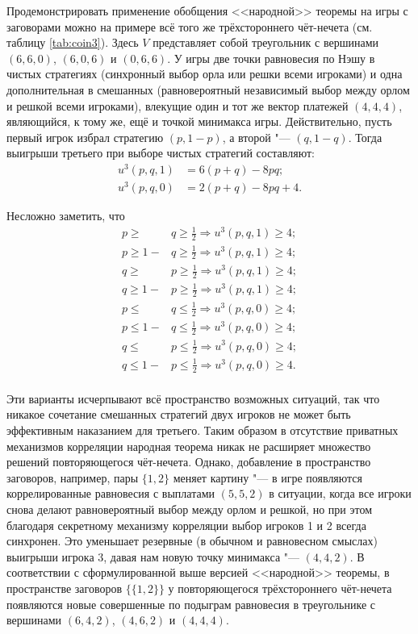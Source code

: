 Продемонстрировать применение обобщения <<народной>> теоремы на игры с заговорами можно на примере всё того же трёхстороннего чёт-нечета (см. таблицу \ref{tab:coin3}). Здесь $V$ представляет собой треугольник с вершинами $(6, 6, 0)$, $(6, 0, 6)$ и $(0, 6, 6)$. У игры две точки равновесия по Нэшу в чистых стратегиях (синхронный выбор орла или решки всеми игроками) и одна дополнительная в смешанных (равновероятный независимый выбор между орлом и решкой всеми игроками), влекущие один и тот же вектор платежей $(4, 4, 4)$, являющийся, к тому же, ещё и точкой минимакса игры. Действительно, пусть первый игрок избрал стратегию $(p, 1 - p)$, а второй "--- $(q, 1 - q)$. Тогда выигрыши третьего при выборе чистых стратегий составляют:
\begin{align*}
	u^3(p, q, 1) &= 6 (p + q) - 8 p q; \\
	u^3(p, q, 0) &= 2 (p + q) - 8 p q + 4.
\end{align*}

Несложно заметить, что
\begin{align*}
	p \ge &q \ge \frac{1}{2} \Rightarrow u^3(p, q, 1) \ge 4; \\
	p \ge 1 - &q \ge \frac{1}{2} \Rightarrow u^3(p, q, 1) \ge 4; \\
	q \ge &p \ge \frac{1}{2} \Rightarrow u^3(p, q, 1) \ge 4; \\
	q \ge 1 - &p \ge \frac{1}{2} \Rightarrow u^3(p, q, 1) \ge 4; \\
	p \le &q \le \frac{1}{2} \Rightarrow u^3(p, q, 0) \ge 4; \\
	p \le 1 - &q \le \frac{1}{2} \Rightarrow u^3(p, q, 0) \ge 4; \\
	q \le &p \le \frac{1}{2} \Rightarrow u^3(p, q, 0) \ge 4; \\
	q \le 1 - &p \le \frac{1}{2} \Rightarrow u^3(p, q, 0) \ge 4. \\
\end{align*}

Эти варианты исчерпывают всё пространство возможных ситуаций, так что никакое сочетание смешанных стратегий двух игроков не может быть эффективным наказанием для третьего. Таким образом в отсутствие приватных механизмов корреляции народная теорема никак не расширяет множество решений повторяющегося чёт-нечета. Однако, добавление в пространство заговоров, например, пары $\{1, 2\}$ меняет картину "--- в игре появляются коррелированные равновесия с выплатами $(5, 5, 2)$ в ситуации, когда все игроки снова делают равновероятный выбор между орлом и решкой, но при этом благодаря секретному механизму корреляции выбор игроков 1 и 2 всегда синхронен. Это уменьшает резервные (в обычном и равновесном смыслах) выигрыши игрока 3, давая нам новую точку минимакса "--- $(4, 4, 2)$. В соответствии с сформулированной выше версией <<народной>> теоремы, в пространстве заговоров $\{\{1, 2\}\}$ у повторяющегося трёхстороннего чёт-нечета появляются новые совершенные по подыграм равновесия в треугольнике с вершинами $(6, 4, 2)$, $(4, 6, 2)$ и $(4, 4, 4)$.

